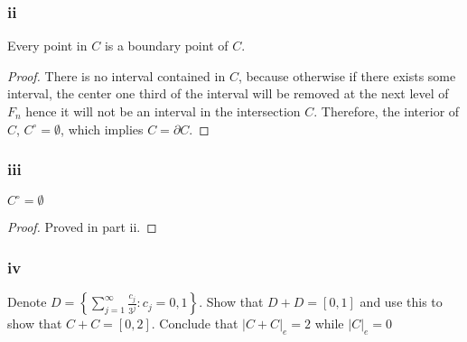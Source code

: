 \subsubsection{ii}

\begin{question}
   Every point in $C$ is a boundary point of $C$.
\end{question}

\begin{answer}
    \begin{proof}
        There is no interval contained in $C$, because otherwise if there exists some interval, the center one third of the interval will be removed at the next level of $F_n$ hence it will not be an interval in the intersection $C$. Therefore, the interior of $C$, $C^\circ = \emptyset$, which implies $C = \partial C$.
    \end{proof}
\end{answer}

\subsubsection{iii}

\begin{question}
   $C^{\circ}=\emptyset$
\end{question}

\begin{answer}
    \begin{proof}
        Proved in part ii.
    \end{proof}
\end{answer}

\subsubsection{iv}

\begin{question}
   Denote $D=\left\{\sum_{j=1}^{\infty} \frac{c_j}{3^j}: c_j=0,1\right\}$. Show that $D+D=[0,1]$ and use this to show that $C+C=[0,2]$. Conclude that $|C+C|_e=2$ while $|C|_e=0$
\end{question}

\begin{answer}
    
\end{answer}
